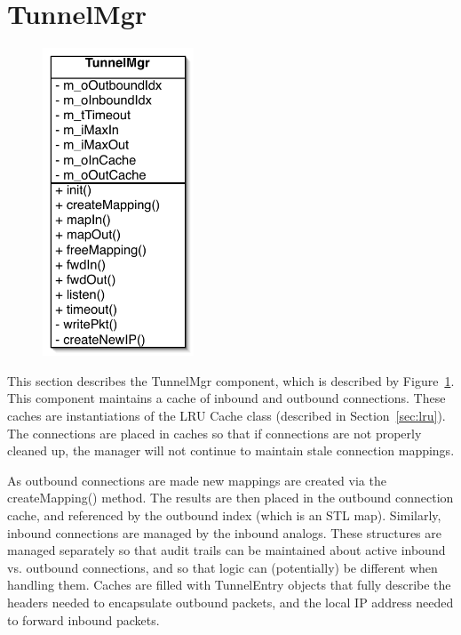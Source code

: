 \section{TunnelMgr}\label{sec:tunmgr}

\begin{figure}
\begin{center}
\includegraphics[width=0.4\textwidth]{figs/tunmgr}
\end{center}
\caption{}
\label{fig:tunmgr}
\end{figure}

This section describes the TunnelMgr component, which is described by Figure~\ref{fig:tunmgr}.  This component maintains a cache of
inbound and outbound connections.  These caches are instantiations of the LRU Cache class (described in Section~\ref{sec:lru}).  The
connections are placed in caches so that if connections are not properly cleaned up, the manager will not continue to maintain stale
connection mappings.

As outbound connections are made new mappings are created via the createMapping() method.  The results are then placed in the outbound
connection cache, and referenced by the outbound index (which is an STL map).  Similarly, inbound connections are managed by the inbound
analogs.  These structures are managed separately so that audit trails can be maintained about active inbound vs. outbound connections, and
so that logic can (potentially) be different when handling them.  Caches are filled with TunnelEntry objects that fully describe the
headers needed to encapsulate outbound packets, and the local IP address needed to forward inbound packets.

